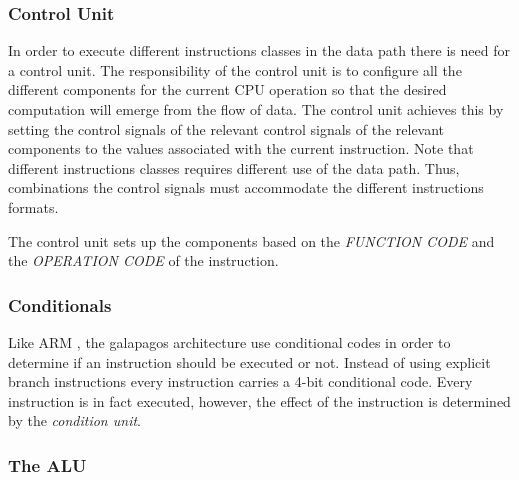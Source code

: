 \subsubsection{Control Unit} \label{fpga:fitness:sss:control_unit}
In order to execute different instructions classes in the data path there is need for a control unit.
The responsibility of the control unit is to configure all the different components for the current CPU operation so that the desired computation will emerge from the flow of data.
The control unit achieves this by setting the control signals of the relevant control signals of the relevant components to the values associated with the current instruction.
Note that different instructions classes requires different use of the data path.
Thus, combinations the control signals must accommodate the different instructions formats.



The control unit sets up the components based on the \emph{FUNCTION CODE} and the \emph{OPERATION CODE} of the instruction.




    



\subsubsection{Conditionals} \label{fpga:fitness:sss:conditionals}
Like ARM , the galapagos architecture use conditional codes in order to determine if an instruction should be executed or not.
Instead of using explicit branch instructions every instruction carries a 4-bit conditional code.
Every instruction is in fact executed, however, the effect of the instruction is determined by the \emph{condition unit}.



\subsubsection{The ALU}\label{fpga:fitness:sss:the_alu}

